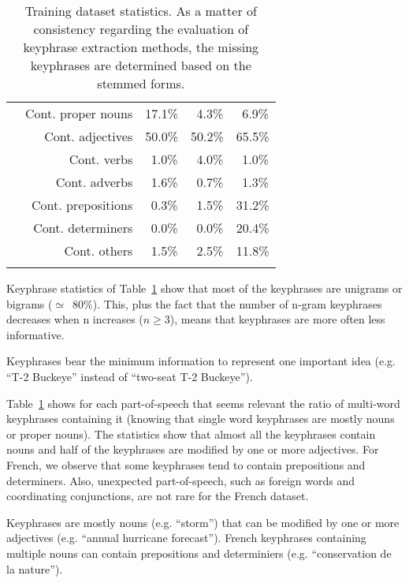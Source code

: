 \begin{table}[h]
\begin{tabular}{@{~}r@{~}r@{~}c@{~}c@{~}c@{~}}
        & Cont. proper nouns & 17.1\% & $~~$4.3\% & $~~$6.9\%\\
        & Cont. adjectives & 50.0\% & 50.2\% & 65.5\%\\
        & Cont. verbs & $~~$1.0\% & $~~$4.0\% & $~~$1.0\%\\
        & Cont. adverbs & $~~$1.6\% & $~~$0.7\% & $~~$1.3\%\\
        & Cont. prepositions & $~~$0.3\% & $~~$1.5\% & 31.2\%\\
        & Cont. determiners & $~~$0.0\% & $~~$0.0\% & 20.4\%\\
        & Cont. others & $~~$1.5\% & $~~$2.5\% & 11.8\%\\
        \addlinespace[.5\defaultaddspace]
        \bottomrule
      \end{tabular}
      \caption{Training dataset statistics. As a matter of consistency regarding
               the evaluation of keyphrase extraction methods, the missing
               keyphrases are determined based on the stemmed forms.
               \label{tab:train_dataset_statistics}}
    \end{table}

    Keyphrase statistics of Table~\ref{tab:train_dataset_statistics} show that
    most of the keyphrases are unigrams or bigrams ($\simeq$~$80\%$). This, plus
    the fact that the number of n-gram keyphrases decreases when n increases
    ($n\geq3$), means that keyphrases are more often less informative.
    
    \begin{property}\label{prop:informativity}
      Keyphrases bear the minimum information to represent one important idea
      (e.g. ``T-2 Buckeye'' instead of ``two-seat T-2 Buckeye'').
    \end{property}

    Table~\ref{tab:train_dataset_statistics} shows for each part-of-speech that
    seems relevant the ratio of multi-word keyphrases containing it (knowing
    that single word keyphrases are mostly nouns or proper nouns). The
    statistics show that almost all the keyphrases contain nouns and half of the
    keyphrases are modified by one or more adjectives. For French, we observe that some
    keyphrases tend to contain prepositions and determiners. Also, unexpected
    part-of-speech, such as foreign words and coordinating conjunctions, are not
    rare for the French dataset.

    \begin{property}\label{prop:noun_phrases}
      Keyphrases are mostly nouns (e.g. ``storm'') that can be modified by one
      or more adjectives (e.g. ``annual hurricane forecast''). French keyphrases
      containing multiple nouns can contain prepositions and determiniers (e.g.
      ``conservation de la nature'').
    \end{property}

